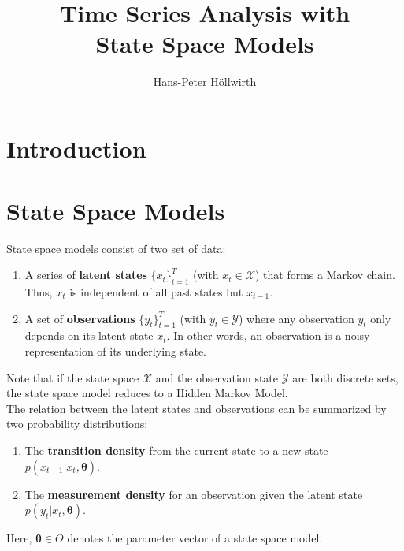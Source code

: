 \documentclass[11pt, oneside]{scrreprt}   	%
\title{\textit{}\\\textit{}\\Time Series Analysis with\\ State Space Models}
\author{Hans-Peter H{\"o}llwirth}
\date{}
\begin{document}
\maketitle

\newpage
\setcounter{secnumdepth}{1}
\setcounter{tocdepth}{1}
\tableofcontents
\newpage

\chapter{Introduction}
\label{chp:introduction}



\chapter{State Space Models}
\label{chp:models}
State space models consist of two set of data:
\begin{enumerate}
	\item A series of \textbf{latent states} $\{x_t\}_{t=1}^T$ (with $x_t \in \mathcal{X}$) that forms a Markov chain. Thus, $x_t$ is independent of all past states but $x_{t-1}$.
	\item A set of \textbf{observations} $\{y_t\}_{t=1}^T$ (with $y_t \in \mathcal{Y}$) where any observation $y_t$ only depends on its latent state $x_t$. In other words, an observation is a noisy representation of its underlying state.
\end{enumerate}
Note that if the state space $\mathcal{X}$ and the observation state $\mathcal{Y}$ are both discrete sets, the state space model reduces to a Hidden Markov Model.\\

The relation between the latent states and observations can be summarized by two probability distributions:
\begin{enumerate}
	\item The \textbf{transition density} from the current state to a new state $p(x_{t+1} | x_t, \boldsymbol{\theta})$.
	\item The \textbf{measurement density} for an observation given the latent state $p(y_t | x_t, \boldsymbol{\theta})$.
\end{enumerate}
Here, $\boldsymbol{\theta} \in \Theta$ denotes the parameter vector of a state space model. 


\end{document}
